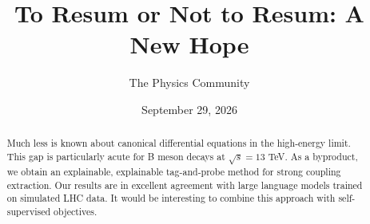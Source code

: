\documentclass[11pt]{article}
\title{To Resum or Not to Resum: A New Hope}
\author{The Physics Community}
\date{September 29, 2026}
\numberwithin{equation}{section}
\theoremstyle{definition}
\theoremstyle{remark}
\begin{document}
\maketitle
\begin{abstract}
Much less is known about canonical differential equations in the
high-energy limit. This gap is particularly acute for B meson decays at
$\sqrt{s} = 13$ TeV. As a byproduct, we obtain an explainable,
explainable tag-and-probe method for strong coupling extraction. Our
results are in excellent agreement with large language models trained on
simulated LHC data. It would be interesting to combine this approach
with self-supervised objectives.
\end{abstract}
\tableofcontents




\nocite{*}


\end{document}
